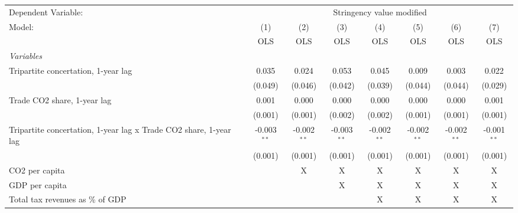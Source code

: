 
\begingroup
\centering
\begin{tabular}{lccccccc}
   \toprule
   Dependent Variable: & \multicolumn{7}{c}{Stringency value modified}\\
   Model:                                                            & (1)           & (2)           & (3)           & (4)           & (5)           & (6)           & (7)\\  
                                                                     &  OLS          & OLS           & OLS           & OLS           & OLS           & OLS           & OLS\\  
   \midrule
   \emph{Variables}\\
   Tripartite concertation, 1-year lag                               & 0.035         & 0.024         & 0.053         & 0.045         & 0.009         & 0.003         & 0.022\\   
                                                                     & (0.049)       & (0.046)       & (0.042)       & (0.039)       & (0.044)       & (0.044)       & (0.029)\\   
   Trade CO2 share, 1-year lag                                       & 0.001         & 0.000         & 0.000         & 0.000         & 0.000         & 0.000         & 0.001\\   
                                                                     & (0.001)       & (0.001)       & (0.002)       & (0.002)       & (0.001)       & (0.001)       & (0.001)\\   
   Tripartite concertation, 1-year lag x Trade CO2 share, 1-year lag & -0.003$^{**}$ & -0.002$^{**}$ & -0.003$^{**}$ & -0.002$^{**}$ & -0.002$^{**}$ & -0.002$^{**}$ & -0.001$^{**}$\\   
                                                                     & (0.001)       & (0.001)       & (0.001)       & (0.001)       & (0.001)       & (0.001)       & (0.001)\\   
   CO2 per capita                                                    &               & X             & X             & X             & X             & X             & X\\  
   GDP per capita                                                    &               &               & X             & X             & X             & X             & X\\  
   Total tax revenues as \% of GDP                                   &               &               &               & X             & X             & X             & X\\  

\end{tabular}

